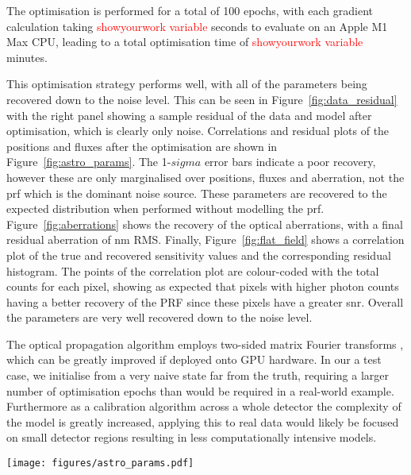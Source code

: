 \documentclass[]{spieman}
\begin{document}
The optimisation is performed for a total of 100 epochs, with each gradient calculation taking \textcolor{red}{showyourwork variable} seconds to evaluate on an Apple M1 Max CPU, leading to a total optimisation time of \textcolor{red}{showyourwork variable} minutes.


This optimisation strategy performs well, with all of the parameters being recovered down to the noise level. This can be seen in Figure~\ref{fig:data_residual} with the right panel showing a sample residual of the data and model after optimisation, which is clearly only noise. Correlations and residual plots of the positions and fluxes after the optimisation are shown in Figure~\ref{fig:astro_params}. The 1-$sigma$ error bars indicate a poor recovery, however these are only marginalised over positions, fluxes and aberration, not the \ac{prf} which is the dominant noise source. These parameters are recovered to the expected distribution when performed without modelling the \ac{prf}. Figure~\ref{fig:aberrations} shows the recovery of the optical aberrations, with a final residual aberration of  nm RMS. Finally, Figure~\ref{fig:flat_field} shows a correlation plot of the true and recovered sensitivity values and the corresponding residual histogram. The points of the correlation plot are colour-coded with the total counts for each pixel, showing as expected that pixels with higher photon counts having a better recovery of the PRF since these pixels have a greater \ac{snr}. Overall the parameters are very well recovered down to the noise level.


The optical propagation algorithm employs two-sided matrix Fourier transforms \cite{Soummer2007}, which can be greatly improved if deployed onto GPU hardware. In our a test case, we initialise from a very naive state far from the truth, requiring a larger number of optimisation epochs than would be required in a real-world example. Furthermore as a calibration algorithm across a whole detector the complexity of the model is greatly increased, applying this to real data would likely be focused on small detector regions resulting in less computationally intensive models.

\begin{figure*}
    \centering
    \texttt{[image: figures/astro\_params.pdf]}
    \caption{Left: recovery of the individual RA-Dec positions of each star, with the top section showing the correlation between the true and recovered values in units of arcseconds. The bottom section shows the individual residuals for each. Clearly these parameters have been well recovered through the optimisation. Right: the recovery of the flux parameters in units of photons. The top section shows the correlation between the true and recovered values, and the bottom showing the resulting residuals. The error bars are the 1-$\sigma$ deviations calculated from the covariance Hessian matrix marginalised over positions, fluxes and aberrations.}
    \label{fig:astro_params}
\end{figure*}
\end{document}
